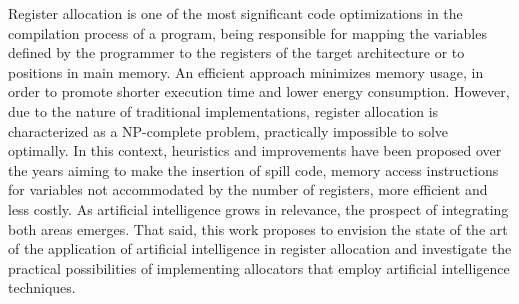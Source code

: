\documentclass[
	12pt,				%
	openright,			%
	twoside,			%
	a4paper,			%
	tcc,			%
	]{ABNT-DC-UEL}
\begin{document}
\begin{Abstract}
Register allocation is one of the most significant code optimizations in the compilation process of a program, being responsible for mapping the variables defined by the programmer to the registers of the target architecture or to positions in main memory. An efficient approach minimizes memory usage, in order to promote shorter execution time and lower energy consumption. However, due to the nature of traditional implementations, register allocation is characterized as a NP-complete problem, practically impossible to solve optimally. In this context, heuristics and improvements have been proposed over the years aiming to make the insertion of spill code, memory access instructions for variables not accommodated by the number of registers, more efficient and less costly. As artificial intelligence grows in relevance, the prospect of integrating both areas emerges. That said, this work proposes to envision the state of the art of the application of artificial intelligence in register allocation and investigate the practical possibilities of implementing allocators that employ artificial intelligence techniques.
\end{Abstract}

\listoffigures*
\cleardoublepage

\listoftables*
\cleardoublepage
\end{document}
